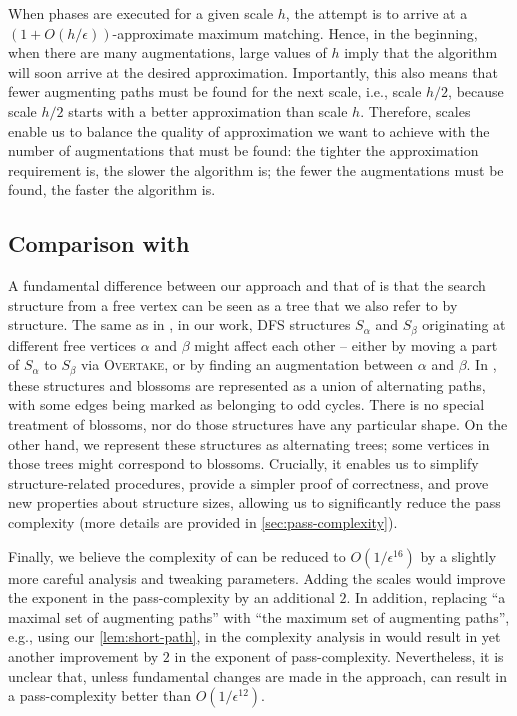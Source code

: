 \documentclass{article}
\newcommand{\eps}{\epsilon}
\newcommand{\algOvertake}{\textsc{Overtake}\xspace}
\begin{document}
When phases are executed for a given scale $h$, the attempt is to arrive at a $(1+O(h/\eps))$-approximate maximum matching. 
Hence, in the beginning, when there are many augmentations, large values of $h$ imply that the algorithm will soon arrive at the desired approximation. Importantly, this also means that fewer augmenting paths must be found for the next scale, i.e., scale $h / 2$, because scale $h/2$ starts with a better approximation than scale $h$. Therefore, scales enable us to balance the quality of approximation we want to achieve with the number of augmentations that must be found: the tighter the approximation requirement is, the slower the algorithm is; the fewer the augmentations must be found, the faster the algorithm is. 





\subsection{Comparison with \cite{FMU22}}
\label{sec:comparison-with-FMU}
A fundamental difference between our approach and that of \cite{FMU22} is that the search structure from a free vertex can be seen as a tree that we also refer to by structure. 
The same as in \cite{FMU22}, in our work, DFS structures $S_\alpha$ and $S_\beta$ originating at different free vertices $\alpha$ and $\beta$ might affect each other -- either by moving a part of $S_\alpha$ to $S_\beta$ via \algOvertake, or by finding an augmentation between $\alpha$ and $\beta$.
In \cite{FMU22}, these structures and blossoms are represented as a union of alternating paths, with some edges being marked as belonging to odd cycles. There is no special treatment of blossoms, nor do those structures have any particular shape.
On the other hand, we represent these structures as alternating trees; some vertices in those trees might correspond to blossoms. Crucially, it enables us to simplify structure-related procedures, provide a simpler proof of correctness, and prove new properties about structure sizes, allowing us to significantly reduce the pass complexity (more details are provided in \cref{sec:pass-complexity}). 


Finally, we believe the complexity of \cite{FMU22} can be reduced to $O(1/\eps^{16})$ by a slightly more careful analysis and tweaking parameters.
Adding the scales would improve the exponent in the pass-complexity by an additional $2$.
In addition, replacing ``a maximal set of augmenting paths'' with ``the maximum set of augmenting paths'', e.g., using our \cref{lem:short-path}, in the complexity analysis in \cite{FMU22} would result in yet another improvement by $2$ in the exponent of pass-complexity.
Nevertheless, it is unclear that, unless fundamental changes are made in the approach, \cite{FMU22} can result in a pass-complexity better than $O(1/\eps^{12})$.
\end{document}
